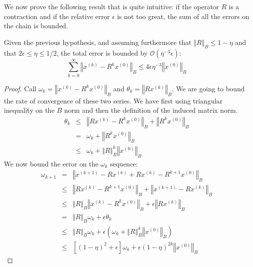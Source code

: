 We now prove the following result that is quite intuitive: if the
operator $R$ is a contraction and if the relative error $\epsilon$
is not too great, the sum of all the errors on the chain is bounded. 

\begin{lemma} Given the previous hypothesis, and assuming furthermore
that $\left\Vert R\right\Vert _{B}\leq1-\eta$ and that $2\epsilon\leq\eta\leq1/2$,
the total error is bounded by $\mathcal{O}\left(\eta^{-3}\epsilon\right)$:
\[
\sum_{k=0}^{\infty}\left\Vert x^{\left(k\right)}-R^{k}x^{\left(0\right)}\right\Vert _{B}\leq4\epsilon\eta^{-3}\left\Vert x^{\left(0\right)}\right\Vert _{B}
\]
\end{lemma}

\begin{proof} Call $\omega_{k}=\left\Vert x^{\left(k\right)}-R^{k}x^{\left(0\right)}\right\Vert _{B}$
and $\theta_{k}=\left\Vert Rx^{\left(k\right)}\right\Vert _{B}$.
We are going to bound the rate of convergence of these two series.
We have first using triangular inequality on the $B$ norm and then
the definition of the induced matrix norm. 
\begin{eqnarray*}
\theta_{k} & \leq & \left\Vert Rx^{\left(k\right)}-R^{k}x^{\left(0\right)}\right\Vert _{B}+\left\Vert R^{k}x^{\left(0\right)}\right\Vert _{B}\\
 & = & \omega_{k}+\left\Vert R^{k}x^{\left(0\right)}\right\Vert _{B}\\
 & \leq & \omega_{k}+\left\Vert R\right\Vert _{B}^{k}\left\Vert x^{\left(0\right)}\right\Vert _{B}
\end{eqnarray*}
We now bound the error on the $\omega_{k}$ sequence: 
\begin{eqnarray*}
\omega_{k+1} & = & \left\Vert x^{\left(k+1\right)}-Rx^{\left(k\right)}+Rx^{\left(k\right)}-R^{k+1}x^{\left(0\right)}\right\Vert _{B}\\
 & \leq & \left\Vert Rx^{\left(k\right)}-R^{k+1}x^{\left(0\right)}\right\Vert _{B}+\left\Vert x^{\left(k+1\right)}-Rx^{\left(k\right)}\right\Vert _{B}\\
 & \leq & \left\Vert R\right\Vert _{B}\left\Vert x^{\left(k\right)}-R^{k}x^{\left(0\right)}\right\Vert _{B}+\epsilon\left\Vert Rx^{\left(k\right)}\right\Vert _{B}\\
 & = & \left\Vert R\right\Vert _{B}\omega_{k}+\epsilon\theta_{k}\\
 & \leq & \left\Vert R\right\Vert _{B}\omega_{k}+\epsilon\left(\omega_{k}+\left\Vert R\right\Vert _{B}^{k}\left\Vert x^{\left(0\right)}\right\Vert _{B}\right)\\
 & \leq & \left[\left(1-\eta\right)^{2}+\epsilon\right]\omega_{k}+\epsilon\left(1-\eta\right)^{2k}\left\Vert x^{\left(0\right)}\right\Vert _{B}
\end{eqnarray*}



\end{proof}
